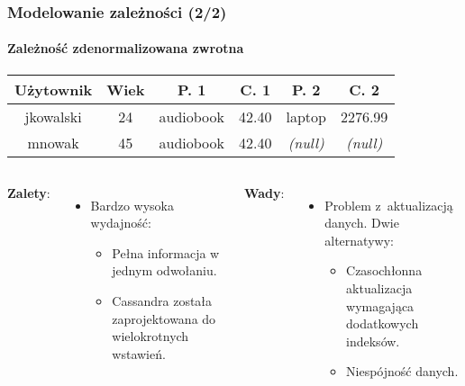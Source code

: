 \documentclass{beamer}
\begin{document}
	\begin{frame}
		\frametitle{Modelowanie zależności (2/2)}
		\framesubtitle{Zależność zdenormalizowana zwrotna}

		\begin{center}
			\begin{tabular}{c|c|c|c|c|c}
				\multicolumn{1}{c}{\textbf{Użytownik}} & \multicolumn{1}{c}{\textbf{Wiek}} & \multicolumn{1}{c}{\textbf{P. 1}} & \multicolumn{1}{c}{\textbf{C. 1}} & \multicolumn{1}{c}{\textbf{P. 2}} & \multicolumn{1}{c}{\textbf{C. 2}}\\
				\hline
				\cellcolor{red!10}jkowalski & 24 & \cellcolor{yellow!10}audiobook & 42.40 & \cellcolor{yellow!10}laptop & 2276.99 \\
				\hline
				\cellcolor{red!10}mnowak & 45 & \cellcolor{yellow!10}audiobook & 42.40 & \cellcolor{yellow!10}\textit{(null)} & \textit{(null)} \\
				\hline
			\end{tabular}
		\end{center}

		\begin{columns}[t]

				\textbf{Zalety}:

				\begin{itemize}
					\item Bardzo wysoka wydajność:

					\begin{itemize}
						\item Pełna informacja w jednym odwołaniu.
						\item Cassandra została zaprojektowana do wielokrotnych wstawień.
					\end{itemize}

				\end{itemize}


				\textbf{Wady}:

				\begin{itemize}
					\item Problem z~aktualizacją danych. Dwie alternatywy:

					\begin{itemize}
						\item Czasochłonna aktualizacja wymagająca dodatkowych indeksów.
						\item Niespójność danych.
					\end{itemize}
				\end{itemize}
		\end{columns}
	\end{frame}
\end{document}
